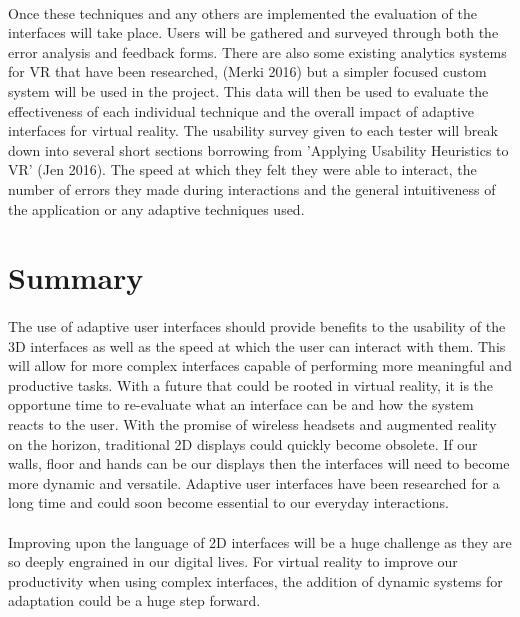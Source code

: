 \documentclass[11pt]{article}
\begin{document}
\paragraph{} 
Once these techniques and any others are implemented the evaluation of the interfaces will take place. Users will be gathered and surveyed through both the error analysis and feedback forms. There are also some existing analytics systems for VR that have been researched, (Merki 2016) but a simpler focused custom system will be used in the project. This data will then be used to evaluate the effectiveness of each individual technique and the overall impact of adaptive interfaces for virtual reality. The usability survey given to each tester will break down into several short sections borrowing from 'Applying Usability Heuristics to VR' (Jen 2016). The speed at which they felt they were able to interact, the number of errors they made during interactions and the general intuitiveness of the application or any adaptive techniques used.


\section{Summary}

\paragraph{}
The use of adaptive user interfaces should provide benefits to the usability of the 3D interfaces as well as the speed at which the user can interact with them. This will allow for more complex interfaces capable of performing more meaningful and productive tasks. With a future that could be rooted in virtual reality, it is the opportune time to re-evaluate what an interface can be and how the system reacts to the user. With the promise of wireless headsets and augmented reality on the horizon, traditional 2D displays could quickly become obsolete. If our walls, floor and hands can be our displays then the interfaces will need to become more dynamic and versatile. Adaptive user interfaces have been researched for a long time and could soon become essential to our everyday interactions.

\paragraph{} 
Improving upon the language of 2D interfaces will be a huge challenge as they are so deeply engrained in our digital lives. For virtual reality to improve our productivity when using complex interfaces, the addition of dynamic systems for adaptation could be a huge step forward.
\end{document}
